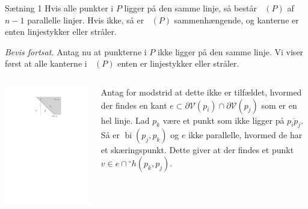 \documentclass{beamer} %
\DeclareMathOperator{\VorG}{Vor_{G}}
\DeclareMathOperator{\bi}{bi}
\begin{document}
\begin{frame}
\begin{block}{Sætning 1}
Hvis alle punkter i $P$ ligger på den samme linje, så består $\VorG(P)$ af $n - 1$ parallelle linjer.
Hvis ikke, så er $\VorG(P)$ sammenhængende, og kanterne er enten linjestykker eller stråler.
\end{block}
\textit{Bevis fortsat.} \pause Antag nu at punkterne i $P$ ikke ligger på den samme linje. \pause Vi viser først at alle kanterne i $\VorG(P)$ enten er linjestykker eller stråler. \pause
\vspace{0.5em}
\begin{columns}
\begin{column}{0.5\textwidth}
	\begin{center}
		\includegraphics[scale=0.8]{../images/diagram_is_connected}
	\end{center}
\end{column}
\begin{column}{0.5\textwidth}
    Antag for modstrid at dette ikke er tilfældet\pause, hvormed der findes en kant $e \subset \partial \mathcal{V}(p_i) \cap \partial \mathcal{V}(p_j)$ som er en hel linje. \pause Lad $p_k$ være et punkt som ikke ligger på $\overline{p_i p_j}$. \pause Så er $\bi(p_j, p_k)$ og $e$ ikke parallelle\pause, hvormed de har et skæringspunkt. \pause Dette giver at der findes et punkt $v \in e \cap {}^{\circ}h(p_k, p_j)$.
\end{column}
\end{columns}
\end{frame}
\end{document}
